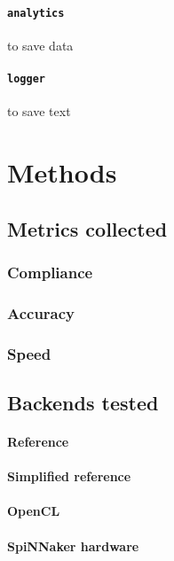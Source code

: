 \documentclass{frontiersSCNS}
\begin{document}
\paragraph{\texttt{analytics}} to save data

\paragraph{\texttt{logger}} to save text

\section{Methods}

\subsection{Metrics collected}

\subsubsection{Compliance}

\subsubsection{Accuracy}

\subsubsection{Speed}

\subsection{Backends tested}

\paragraph{Reference}

\paragraph{Simplified reference}

\paragraph{OpenCL}

\paragraph{SpiNNaker hardware}
\end{document}

